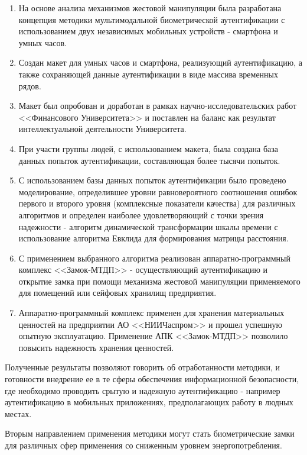 \begin{enumerate}
  \item На основе анализа механизмов жестовой манипуляции была разработана концепция методики мультимодальной биометрической аутентификации с использованием двух независимых мобильных устройств - смартфона и умных часов. 
  \item Создан макет для умных часов и смартфона, реализующий аутентификацию, а также сохраняющей данные аутентификации в виде массива временных рядов.
  \item Макет был опробован и доработан в рамках научно-исследовательских работ <<Финансового Университета>> и поставлен на баланс как результат интеллектуальной деятельности Университета. 
  \item При участи группы людей, с использованием макета, была создана база данных попыток аутентификации, составляющая более тысячи попыток.
  \item С использованием базы данных попыток аутентификации было проведено моделирование, определившее уровни равновероятного соотношения ошибок первого и второго уровня (комплексные показатели качества) для различных алгоритмов и определен наиболее удовлетворяющий с точки зрения надежности - алгоритм динамической трансформации шкалы времени с использование алгоритма Евклида для формирования матрицы расстояния.
  \item С применением выбранного алгоритма реализован аппаратно-программный комплекс <<Замок-МТДП>> - осуществляющий  аутентификацию и открытие замка при помощи механизма жестовой манипуляции применяемого для помещений или сейфовых хранилищ предприятия. 
  \item Аппаратно-программный комплекс применен для хранения материальных ценностей на предприятии АО <<НИИЧаспром>> и прошел успешную опытную эксплуатацию. Применение АПК <<Замок-МТДП>> позволило повысить надежность хранения ценностей. 
\end{enumerate}

Полученные результаты позволяют говорить об отработанности методики, и готовности внедрение ее в те сферы обеспечения информационной безопасности, где необходимо проводить срытую и надежную аутентификацию - например аутентификацию в мобильных приложениях, предполагающих работу в людных местах. 

Вторым направлением применения методики могут стать биометрические замки для различных сфер применения со сниженным уровнем энергопотребления.   